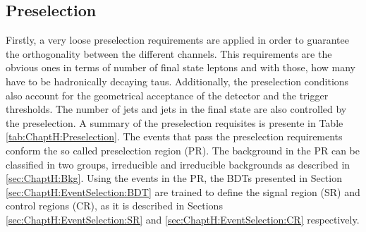 \subsection{Preselection}
\label{sec:ChaptH:EventSelection:PR}
Firstly, a very loose preselection requirements are applied in order to guarantee the orthogonality between the 
different \tHq channels. This requirements are the obvious ones in terms of number of final state leptons and
with those, how many have to be hadronically decaying taus. Additionally, the preselection conditions also account
for the geometrical acceptance of the detector and the trigger thresholds. The number of jets and \btagged jets
in the final state are also controlled by the preselection. A summary of the preselection requisites is
presente in Table \ref{tab:ChaptH:Preselection}. The events that pass the preselection requirements
conform the so called preselection region (PR). The background in the PR can be classified in two groups, irreducible 
and irreducible backgrounds as described in \ref{sec:ChaptH:Bkg}. Using the events in the PR, the BDTs presented
in Section \ref{sec:ChaptH:EventSelection:BDT} are trained to define the signal region (SR) and control regions (CR), 
as it is described in Sections \ref{sec:ChaptH:EventSelection:SR} and \ref{sec:ChaptH:EventSelection:CR} respectively. 




